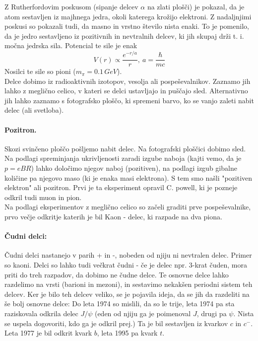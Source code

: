 \documentclass[a4paper]{article}
\begin{document}
Z Rutherfordovim poskusom (sipanje delcev $\alpha$ na zlati plošči) je pokazal, da je atom sestavljen iz majhnega jedra, okoli katerega krožijo elektroni. Z nadaljnjimi poskusi so pokazali tudi, da masno in vrstno število nista enaki.
To je pomenilo, da je jedro sestavljeno iz pozitivnih in nevtralnih delcev, ki jih skupaj drži t. i. močna jedrska sila. Potencial te sile je enak
$$V(r) \propto \frac{e^{-r/a}}{r},~a=\frac{\hbar}{mc}$$
Nosilci te sile so pioni ($m_\pi = 0.1\,GeV$). \\
Delce dobimo iz radioaktivnih izotopov, vesolja ali pospeševalnikov. Zaznamo jih lahko z meglično celico, v kateri se delci ustavljajo in puščajo sled. Alternativno jih lahko zaznamo s fotografsko ploščo, ki spremeni barvo, ko se vanjo zaleti nabit delec (ali svetloba). \\
\paragraph{Pozitron.} Skozi svinčeno ploščo pošljemo nabit delec. Na fotografski ploščici dobimo sled. Na podlagi spreminjanja ukrivljenosti zaradi izgube naboja (kajti vemo, da je $p=eBR$) lahko določimo njegov naboj (pozitiven), na podlagi izgub gibalne količine pa
njegovo maso (ki je enaka masi elektrona). S tem smo našli "pozitiven elektron" ali pozitron. Prvi je ta eksperiment opravil C. powell, ki je pozneje odkril tudi muon in pion. \\
Na podlagi eksperimentov z meglično celico so začeli graditi prve pospeševalnike, prvo večje odkritje katerih je bil Kaon - delec, ki razpade na dva piona. \\
\paragraph{Čudni delci:} Čudni delci nastanejo v parih + in -, nobeden od njiju ni nevtralen delec. Primer so kaoni. Delci so lahko tudi večkrat čudni - če je delec npr. 3-krat čuden, mora priti do treh razpadov, da dobimo ne čudne delce.
Te osnovne delce lahko razdelimo na vrsti (barioni in mezoni), in sestavimo nekakšen periodni sistem teh delcev. Ker je bilo teh delcev veliko, se je pojavila ideja,
da se jih da razdeliti na še bolj osnovne delce: Do leta 1974 so mislili, da so le trije, leta 1974 pa sta raziskovala odkrila delec $J/\psi$ (eden od njiju ga je poimenoval $J$, drugi pa $\psi$. Nista se uspela dogovoriti, kdo ga je odkril prej.)
Ta je bil sestavljen iz kvarkov $c$ in $c^-$. Leta 1977 je bil odkrit kvark $b$, leta 1995 pa kvark $t$.
\end{document}
